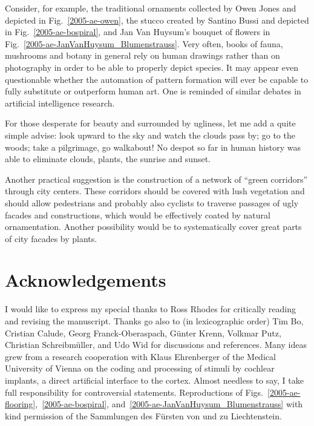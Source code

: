 \documentclass[%
 reprint,
 showpacs,
 showkeys,
 amsmath,
 amssymb,
 aps,
 pra,
 longbibliography,
 floatfix,
 ]{revtex4-1}
\begin{document}
Consider, for example, the traditional ornaments collected by Owen Jones
\cite{jones-goo} and depicted in Fig.~\ref{2005-ae-owen}, the stucco created by Santino Bussi and
depicted in Fig.~\ref{2005-ae-bospiral}, and Jan Van Huysum's bouquet of flowers
in Fig.~\ref{2005-ae-JanVanHuysum_Blumenstrauss}.
Very often, books of fauna, mushrooms and botany in general rely on human drawings rather than on photography in order to be able to properly depict species.
It may appear even questionable whether the automation of
pattern formation will ever be capable to fully substitute or outperform
human art.
One is reminded of similar debates in artificial intelligence research.

For those desperate for beauty and surrounded by ugliness,
let me add a quite simple advise: look
upward to the sky and watch the clouds pass by;
go to the woods; take a pilgrimage, go walkabout!
No despot so far in human history was able to eliminate clouds, plants,
the sunrise and sunset.

Another practical suggestion is the construction of a network of ``green corridors''
through city centers. These corridors should be covered with lush vegetation
and should allow pedestrians and probably also cyclists to traverse
passages of ugly facades and constructions, which would be effectively coated
by natural ornamentation.
Another possibility would be to systematically cover great parts of city facades by plants.


\section*{Acknowledgements}
I would like to express my special thanks to Ross Rhodes
for critically reading and revising the manuscript.
Thanks go also to (in lexicographic order)
Tim Bo,
Cristian Calude,
Georg Franck-Oberaspach,
G\"unter Krenn,
Volkmar Putz,
Christian Schreibm\"uller,
and
Udo Wid
for discussions and references.
Many ideas grew from a research cooperation with Klaus Ehrenberger
of the Medical University of Vienna on the coding and processing of
stimuli by cochlear implants, a direct artificial interface to the cortex.
Almost needless to say,
I take full responsibility for controversial statements.
Reproductions of Figs.~\ref{2005-ae-flooring},~\ref{2005-ae-bospiral}, and~\ref{2005-ae-JanVanHuysum_Blumenstrauss}
with kind permission of the Sammlungen des F\"ursten von und zu Liechtenstein.




\end{document}
